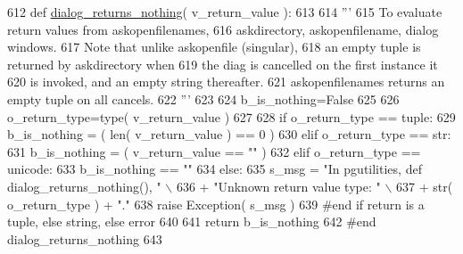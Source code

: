 \begin{DoxyCode}
612 \textcolor{keyword}{def }\hyperlink{namespacenegui_1_1pgutilities_aa839d4997d2bd2c15016c33cc7fce3b0}{dialog\_returns\_nothing}( v\_return\_value ):
613 
614     \textcolor{stringliteral}{'''}
615 \textcolor{stringliteral}{    To evaluate return values from askopenfilenames,}
616 \textcolor{stringliteral}{    askdirectory, askopenfilename, dialog windows.}
617 \textcolor{stringliteral}{    Note that unlike askopenfile (singular),}
618 \textcolor{stringliteral}{    an empty tuple is returned by askdirectory when}
619 \textcolor{stringliteral}{    the diag is cancelled on the first instance it}
620 \textcolor{stringliteral}{    is invoked, and an empty string thereafter.  }
621 \textcolor{stringliteral}{    askopenfilenames returns an empty tuple on all cancels.}
622 \textcolor{stringliteral}{    '''} 
623 
624     b\_is\_nothing=\textcolor{keyword}{False}
625 
626     o\_return\_type=type( v\_return\_value )
627 
628     \textcolor{keywordflow}{if} o\_return\_type == tuple:
629         b\_is\_nothing = ( len( v\_return\_value ) == 0 )
630     \textcolor{keywordflow}{elif} o\_return\_type == str:
631         b\_is\_nothing = ( v\_return\_value == \textcolor{stringliteral}{""} )
632     \textcolor{keywordflow}{elif} o\_return\_type == unicode:
633         b\_is\_nothing == \textcolor{stringliteral}{""}
634     \textcolor{keywordflow}{else}:
635         s\_msg = \textcolor{stringliteral}{"In pgutilities, def dialog\_returns\_nothing(), "} \(\backslash\)
636                 + \textcolor{stringliteral}{"Unknown return value type: "} \(\backslash\)
637                 + str( o\_return\_type ) + \textcolor{stringliteral}{"."}
638         \textcolor{keywordflow}{raise} Exception( s\_msg )
639     \textcolor{comment}{#end if return is a tuple, else string, else error}
640 
641     \textcolor{keywordflow}{return} b\_is\_nothing 
642 \textcolor{comment}{#end dialog\_returns\_nothing}
643 
\end{DoxyCode}

